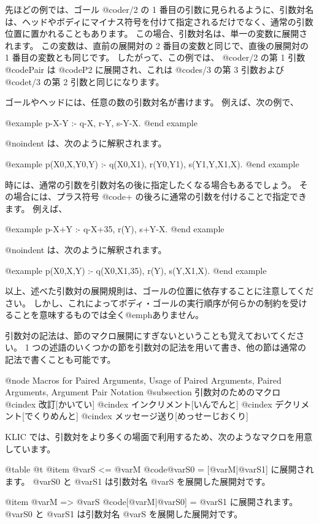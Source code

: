 先ほどの例では、ゴール @code{r/2} の 1 番目の引数に見られるように、引数対名は、ヘッドやボディにマイナス符号を付けて指定されるだけでなく、通常の引数位置に置かれることもあります。
この場合、引数対名は、単一の変数に展開されます。
この変数は、直前の展開対の 2 番目の変数と同じで、直後の展開対の 1 番目の変数とも同じです。
したがって、この例では、 @code{r/2} の第 1 引数 @code{Pair} は @code{P2} に展開され、これは @code{s/3} の第 3 引数および @code{t/3} の第 2 引数と同じになります。

ゴールやヘッドには、任意の数の引数対名が書けます。
例えば、次の例で、

@example
p-X-Y :- q-X, r-Y, s-Y-X.
@end example

@noindent
は、次のように解釈されます。

@example
p(X0,X,Y0,Y) :- q(X0,X1), r(Y0,Y1), s(Y1,Y,X1,X).
@end example

時には、通常の引数を引数対名の後に指定したくなる場合もあるでしょう。
その場合には、プラス符号 @code{+} の後ろに通常の引数を付けることで指定できます。
例えば、

@example
p-X+Y :- q-X+35, r(Y), s+Y-X.
@end example

@noindent
は、次のように解釈されます。

@example
p(X0,X,Y) :- q(X0,X1,35), r(Y), s(Y,X1,X).
@end example

以上、述べた引数対の展開規則は、ゴールの位置に依存することに注意してください。
しかし、これによってボディ・ゴールの実行順序が何らかの制約を受けることを意味するものでは全く@emph{ありません}。

引数対の記法は、節のマクロ展開にすぎないということも覚えておいてください。
 1 つの述語のいくつかの節を引数対の記法を用いて書き、他の節は通常の記法で書くことも可能です。

@node Macros for Paired Arguments, Usage of Paired Arguments, Paired Arguments, Argument Pair Notation
@subsection 引数対のためのマクロ
@cindex 改訂[かいてい]
@cindex インクリメント[いんでんと]
@cindex デクリメント[でくりめんと]
@cindex メッセージ送り[めっせーじおくり]

KLIC では、引数対をより多くの場面で利用するため、次のようなマクロを用意しています。

@table @t
@item @var{S} <= @var{M}
@code{@var{S0} = [@var{M}|@var{S1}]} に展開されます。 
@var{S0} と @var{S1} は引数対名 @var{S} を展開した展開対です。

@item @var{M} => @var{S}
@code{[@var{M}|@var{S0}] = @var{S1}} に展開されます。 
@var{S0} と @var{S1} は引数対名 @var{S} を展開した展開対です。

